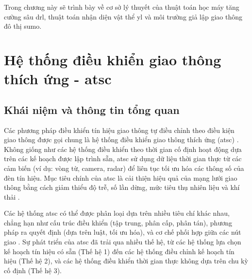 Trong chương này sẽ trình bày về cơ sở lý thuyết của thuật toán học máy tăng
cường sâu \ac{drl}, thuật toán nhận diện vật thể \ac{yl} và môi trường giả lập giao
thông đô thị \ac{sumo}.

\section{Hệ thống điều khiển giao thông thích ứng - \ac{atsc}}
\subsection{Khái niệm và thông tin tổng quan}
Các phương pháp điều khiển tín hiệu giao thông tự điều chỉnh theo điều kiện giao
thông được gọi chung là hệ thống điều khiển giao thông thích ứng (\ac{atsc}) \cite{Shams2023}.
Không giống như các hệ thống điều khiển theo thời gian cố định hoạt động dựa
trên các kế hoạch được lập trình sẵn, \ac{atsc} sử dụng dữ liệu thời gian thực
từ các cảm biến (ví dụ: vòng từ, camera, radar) để liên tục tối ưu hóa các thông
số của đèn tín hiệu. Mục tiêu chính của \ac{atsc} là cải thiện hiệu quả của mạng
lưới giao thông bằng cách giảm thiểu độ trễ, số lần dừng, mức tiêu thụ nhiên liệu
và khí thải \cite{Stevanovic2010}.

Các hệ thống \ac{atsc} có thể được phân loại dựa trên nhiều tiêu chí khác nhau, chẳng
hạn như cấu trúc điều khiển (tập trung, phân cấp, phân tán), phương pháp ra
quyết định (dựa trên luật, tối ưu hóa), và cơ chế phối hợp giữa các nút giao
\cite{Shams2023}. Sự phát triển của \ac{atsc} đã trải qua nhiều thế hệ, từ các hệ
thống lựa chọn kế hoạch tín hiệu có sẵn (Thế hệ 1) đến các hệ thống điều chỉnh kế
hoạch tín hiệu (Thế hệ 2), và các hệ thống điều khiển thời gian thực không dựa
trên chu kỳ cố định (Thế hệ 3).

